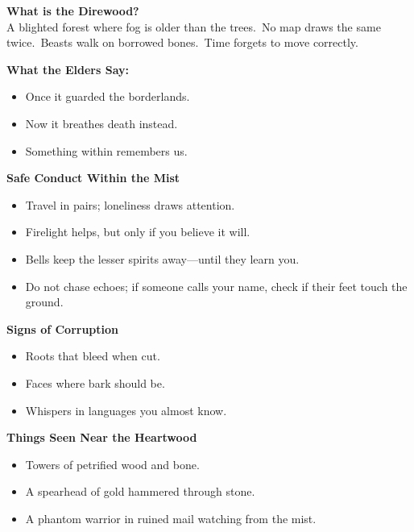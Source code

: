 \documentclass[11pt]{article}
\begin{document}
    \noindent
    \textbf{What is the Direwood?}\\
    A blighted forest where fog is older than the trees.\
    No map draws the same twice.\
    Beasts walk on borrowed bones.\
    Time forgets to move correctly.
    
    \vspace{0.6em}
    
    \noindent
    \textbf{What the Elders Say:}
    \begin{itemize}
        \item Once it guarded the borderlands.
        \item Now it breathes death instead.
        \item Something within remembers us.
    \end{itemize}
    
    \vspace{0.4em}
    
    \noindent
    \textbf{Safe Conduct Within the Mist}
    \begin{itemize}
        \item Travel in pairs; loneliness draws attention.
        \item Firelight helps, but only if you believe it will.
        \item Bells keep the lesser spirits away---until they learn you.
        \item Do not chase echoes; if someone calls your name, check if their feet touch the ground.
    \end{itemize}
    
    \vspace{0.4em}
    
    \noindent
    \textbf{Signs of Corruption}
    \begin{itemize}
        \item Roots that bleed when cut.
        \item Faces where bark should be.
        \item Whispers in languages you almost know.
    \end{itemize}
    
    \vspace{0.6em}
    
    \noindent
    \textbf{Things Seen Near the Heartwood}
    \begin{itemize}
        \item Towers of petrified wood and bone.
        \item A spearhead of gold hammered through stone.
        \item A phantom warrior in ruined mail watching from the mist.
    \end{itemize}
    
\end{document}
